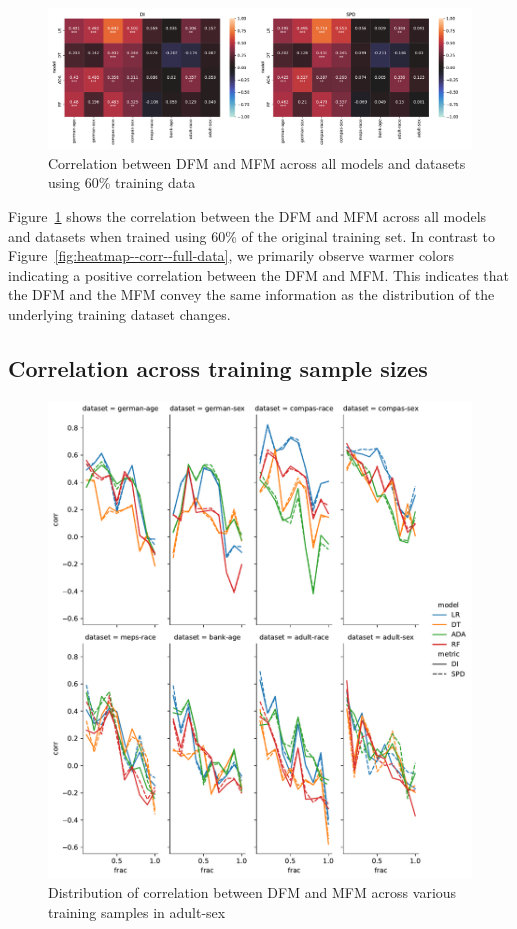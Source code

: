 \documentclass{article}
\begin{document}
\begin{figure}
  \centering
  \includegraphics[width=0.95\linewidth]{heatmap--corr--training-sets-frac.pdf}
  \caption{Correlation between DFM and MFM across all models and
    datasets using 60\% training data}
  \label{fig:heatmap--corr--training-sets-frac}
\end{figure}

Figure \ref{fig:heatmap--corr--training-sets-frac} shows the
correlation between the DFM and MFM across all models and datasets
when trained using 60\% of the original training set. In contrast to
Figure \ref{fig:heatmap--corr--full-data}, we primarily observe warmer
colors indicating a positive correlation between the DFM and MFM. This
indicates that the DFM and the MFM convey the same information as the
distribution of the underlying training dataset changes.

\subsection{Correlation across training sample sizes}\label{sec:results-training-sets}

\begin{figure}
  \centering
  \includegraphics[width=0.95\linewidth]{lineplot--frac--corr.pdf}
  \caption{Distribution of correlation between DFM and MFM across
    various training samples in adult-sex}
  \label{fig:lineplot--frac--corr}
\end{figure}
\end{document}
